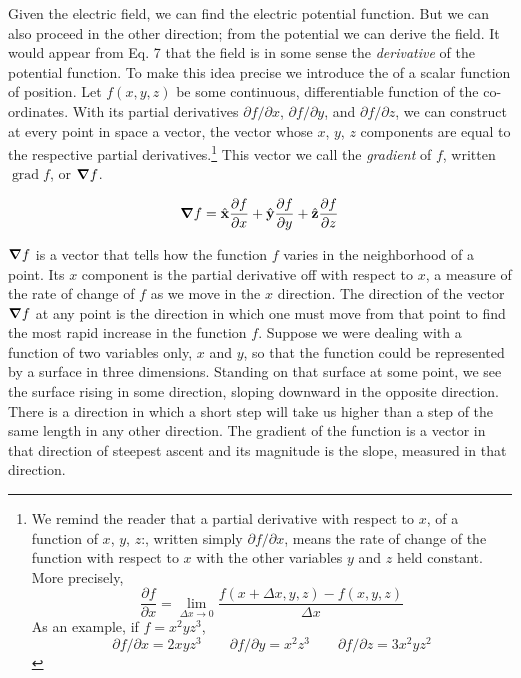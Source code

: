 Given the electric field, we can find the electric potential function.
But we can also proceed in the other direction; from the potential we
can derive the field. It would appear from Eq. 7 that the field is in
some sense the \emph{derivative} of the potential function. To make this idea
precise we introduce the  of a scalar function of position.
Let $f(x,y,z)$ be some continuous, differentiable function of the co-
ordinates. With its partial derivatives $\partial f/\partial x$, 
$\partial f/\partial y$, and $\partial f/\partial z$,  we
can construct at every point in space a vector, the vector whose $x$, $y$, $z$
components are equal to the respective partial derivatives.\footnote{We
remind the reader that a partial derivative with respect to $x$, of a function of
$x$, $y$, $z$:, written simply $\partial f/\partial x$,
means the rate of change of the function with respect to $x$
with the other variables $y$ and $z$ held constant. More precisely,
\begin{equation*}
  \frac{\partial f}{\partial x} = \lim_{\Delta x\rightarrow0} \frac{f(x+\Delta x,y,z)-f(x,y,z)}{\Delta x}
\end{equation*}
As an example, if $f = x^2yz^3$,
\begin{equation*}
  \partial f/\partial x=2xyz^3 \qquad \partial f/\partial y=x^2z^3 \qquad \partial f/\partial z = 3x^2yz^2
\end{equation*}
} This
vector we call the \emph{gradient} of $f$, written $\operatorname{grad} f$, or $\boldsymbol{\nabla} f$.
\begin{framed}
\begin{equation}
  \boldsymbol{\nabla} f = \hat{\mathbf{x}} \frac{\partial f}{\partial x} + \hat{\mathbf{y}} \frac{\partial f}{\partial y}
          + \hat{\mathbf{z}} \frac{\partial f}{\partial z}
\end{equation}
\end{framed}
\noindent $\boldsymbol{\nabla} f$ is a vector that tells how the function $f$ varies in the neighborhood
of a point. Its $x$ component is the partial derivative off with respect
to $x$, a measure of the rate of change of $f$ as we move in the $x$ direction.
The direction of the vector $\boldsymbol{\nabla} f$ at any point is the direction in which
one must move from that point to find the most rapid increase in the
function $f$. Suppose we were dealing with a function of two variables
only, $x$ and $y$, so that the function could be represented by a surface
in three dimensions. Standing on that surface at some point, we see
the surface rising in some direction, sloping downward in the opposite
direction. There is a direction in which a short step will take us
higher than a step of the same length in any other direction. The
gradient of the function is a vector in that direction of steepest ascent
and its magnitude is the slope, measured in that direction.

